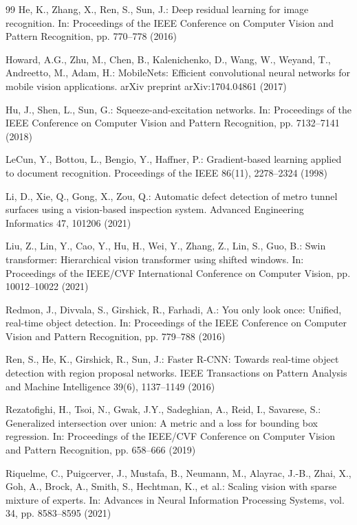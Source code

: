 \documentclass[twocolumn]{sn-jnl}
\begin{document}
\begin{thebibliography}{99}
		He, K., Zhang, X., Ren, S., Sun, J.: Deep residual learning for image recognition. In: Proceedings of the IEEE Conference on Computer Vision and Pattern Recognition, pp. 770–778 (2016)
		
		Howard, A.G., Zhu, M., Chen, B., Kalenichenko, D., Wang, W., Weyand, T., Andreetto, M., Adam, H.: MobileNets: Efficient convolutional neural networks for mobile vision applications. arXiv preprint arXiv:1704.04861 (2017)
		
		Hu, J., Shen, L., Sun, G.: Squeeze-and-excitation networks. In: Proceedings of the IEEE Conference on Computer Vision and Pattern Recognition, pp. 7132–7141 (2018)
		
		LeCun, Y., Bottou, L., Bengio, Y., Haffner, P.: Gradient-based learning applied to document recognition. Proceedings of the IEEE 86(11), 2278–2324 (1998)
		
		Li, D., Xie, Q., Gong, X., Zou, Q.: Automatic defect detection of metro tunnel surfaces using a vision-based inspection system. Advanced Engineering Informatics 47, 101206 (2021)
		
		Liu, Z., Lin, Y., Cao, Y., Hu, H., Wei, Y., Zhang, Z., Lin, S., Guo, B.: Swin transformer: Hierarchical vision transformer using shifted windows. In: Proceedings of the IEEE/CVF International Conference on Computer Vision, pp. 10012–10022 (2021)
		
		Redmon, J., Divvala, S., Girshick, R., Farhadi, A.: You only look once: Unified, real-time object detection. In: Proceedings of the IEEE Conference on Computer Vision and Pattern Recognition, pp. 779–788 (2016)
		
		Ren, S., He, K., Girshick, R., Sun, J.: Faster R-CNN: Towards real-time object detection with region proposal networks. IEEE Transactions on Pattern Analysis and Machine Intelligence 39(6), 1137–1149 (2016)
		
		Rezatofighi, H., Tsoi, N., Gwak, J.Y., Sadeghian, A., Reid, I., Savarese, S.: Generalized intersection over union: A metric and a loss for bounding box regression. In: Proceedings of the IEEE/CVF Conference on Computer Vision and Pattern Recognition, pp. 658–666 (2019)
		
		Riquelme, C., Puigcerver, J., Mustafa, B., Neumann, M., Alayrac, J.-B., Zhai, X., Goh, A., Brock, A., Smith, S., Hechtman, K., et al.: Scaling vision with sparse mixture of experts. In: Advances in Neural Information Processing Systems, vol. 34, pp. 8583–8595 (2021)
		

\end{thebibliography}
\end{document}
